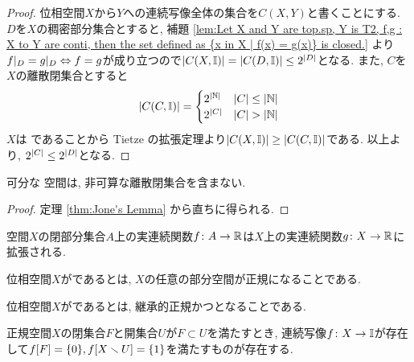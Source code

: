 \documentclass[uplatex, dvipdfmx, a4paper, 12pt, class=jsbook, crop=false]{standalone}
\begin{document}
\begin{proof}
	位相空間$ X $から$ Y $への連続写像全体の集合を$ C(X, Y) $と書くことにする. $ D $を$ X $の稠密部分集合とすると, 補題 \ref{lem:Let X and Y are top.sp, Y is T2, f,g : X to Y are conti, then the set defined as {x in X | f(x) = g(x)} is closed.} より$ f|_D = g|_D  \Leftrightarrow f =g $が成り立つので$ \left|C(X, \mathbb{I})\right| = \left|C(D, \mathbb{I})\right| \leq 2^{\left|D\right|} $となる. また, $ C $を$ X $の離散閉集合とすると
	$$ \left|C(C, \mathbb{I})\right| =\begin{cases}
	2^{\left|\mathbb{N}\right|} & \left|C\right| \leq \left|\mathbb{N}\right|\\
	2^{\left|C\right|} & \left|C\right| > \left|\mathbb{N}\right|
	\end{cases} $$
	$ X $は  であることから Tietze の拡張定理より$ \left|C(X, \mathbb{I})\right| \geq \left|C(C, \mathbb{I})\right| $である. 以上より, $ 2^{\left|C\right|} \leq 2^{\left|D\right|} $となる.
\end{proof}

\begin{corollary}
	\label{coro:Corollary of Jone's Lamma}
	可分な  空間は, 非可算な離散閉集合を含まない.
\end{corollary}

\begin{proof}
	定理 \ref{thm:Jone's Lemma} から直ちに得られる.
\end{proof}

\begin{theorem}[\Tietze]
	\label{thm:Tietze's extension theorem}
	 空間$ X $の閉部分集合$ A $上の実連続関数$ f \colon A \to \mathbb{R} $は$ X $上の実連続関数$ g \colon X \to \mathbb{R} $に拡張される.
\end{theorem}

\begin{definition}
	位相空間$ X $がであるとは, $ X $の任意の部分空間が正規になることである.
\end{definition}

\begin{definition}
	位相空間$ X $がであるとは, 継承的正規かつとなることである.
\end{definition}

\begin{theorem}
	\label{T400003}
	正規空間\( X \)の閉集合\( F \)と開集合\( U \)が\( F \subset U \)を満たすとき,
	連続写像\( f\colon X\to\mathbb{I} \)が存在して\( \mapset{f}{F} = \lrbrace{0},
	\mapset{f}{X \setminus U} = \lrbrace{1} \)を満たすものが存在する.
\end{theorem}
\end{document}
